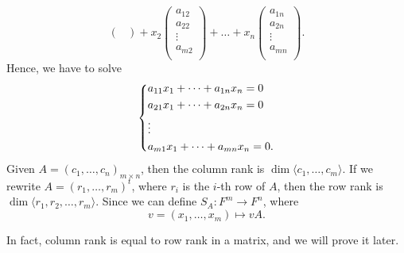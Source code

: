 \begin{explanation}
\[\begin{pmatrix}
        \end{pmatrix} + x_2 \begin{pmatrix}
             a_{12}  \\
             a_{22}  \\
             \vdots \\
             a_{m2} \\
        \end{pmatrix} + \dots + x_n \begin{pmatrix}
             a_{1n}  \\
             a_{2n}  \\
             \vdots \\
             a_{mn} \\
        \end{pmatrix}.
    \] Hence, we have to solve 
    \[
        \begin{dcases}
            a_{11} x_1 + \dots + a_{1n} x_n = 0 \\
            a_{21} x_1 + \dots + a_{2n} x_n = 0 \\
            \vdots \\
            a_{m1} x_1 + \dots + a_{mn} x_n = 0.
        \end{dcases}
    \]
    Given \(A = (c_1, \dots , c_n)_{m \times n}\), then the column rank is \(\dim \langle c_1, \dots , c_m \rangle \). If we rewrite \(A = (r_1, \dots , r_m)^t\), where \(r_i\) is the \(i\)-th row of \(A\), then the row rank is \(\dim \langle r_1, r_2, \dots , r_m \rangle \). Since we can define \(S_A: F^m \to F^n\), where 
    \[
        v = (x_1, \dots , x_m) \mapsto vA.
    \]     
    \begin{remark}
        In fact, column rank is equal to row rank in a matrix, and we will prove it later.
    \end{remark}
\end{explanation}

